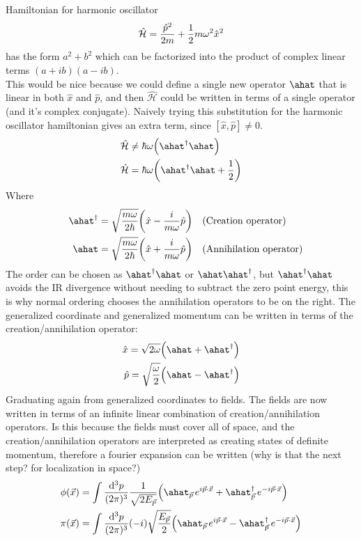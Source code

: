 \newpage Hamiltonian for harmonic oscillator 
\begin{equation}
	\hat{\mathcal{H}}=\frac{\hat{p}^2}{2m}+\oo{2}m\omega^2\hat{x}^2\label{eqn:harmonicHamiltonian}
\end{equation}
has the form \(a^2+b^2\) which can be factorized into the product of complex linear terms \((a+ib)(a-ib)\).\\ This would be nice because we could define a single new operator \(\ahat\) that is linear in both \(\hat{x}\) and \(\hat{p}\), and then \(\hat{\mathcal{H}}\) could be written in terms of a single operator (and it's complex conjugate). 
Naively trying this substitution for the harmonic oscillator hamiltonian gives an extra term, since \([\hat{x},\hat{p}]\neq0\). 
\begin{align*}
	\hat{\mathcal{H}}&\neq\hbar\omega\qty(\ahat^{\dagger}\ahat)
	\\
	\hat{\mathcal{H}}&=\hbar\omega\qty(\ahat^{\dagger}\ahat+\frac{1}{2})
\end{align*}
Where
\begin{align*}
	\quad\ahat^{\dagger}&=\sqrt{\frac{m\omega}{2\hbar}}\qty(\hat{x}-\frac{i}{m\omega}\hat{p})\quad \text{(Creation operator)}
	\\
	\quad\ahat      &=\sqrt{\frac{m\omega}{2\hbar}}\qty(\hat{x}+\frac{i}{m\omega}\hat{p})\quad \text{(Annihilation operator)}
\end{align*}
The order can be chosen as \(\ahat^{\dagger}\ahat\) or \(\ahat\ahat^{\dagger}\), but \(\ahat^{\dagger}\ahat\) avoids the IR divergence without needing to subtract the zero point energy, this is why normal ordering chooses the annihilation operators to be on the right. The generalized coordinate and generalized momentum can be written in terms of the creation/annihilation operator:
\begin{align*}
	\hat{x}=\sqrt{2\omega}\qty(\ahat+\ahat^{\dagger})%
	\\
	\hat{p}=\sqrt{\frac{\omega}{2}}\qty(\ahat-\ahat^{\dagger})
\end{align*}
Graduating again from generalized coordinates to fields. The fields are now written in terms of an infinite linear combination of creation/annihilation operators. Is this because the fields must cover all of space, and the creation/annihilation operators are interpreted as creating states of definite momentum, therefore a fourier expansion can be written (why is that the next step? for localization in space?)
\begin{align}
	\phi(\vec{x})&=\int
	\frac{\d^3p}{(2\pi)^3}
	\oo{\sqrt{2E_{\vec{p}}}}
	\qty(
		\ahat_{\ppp}e^{i\vec{p}\cdot\vec{x}}
		+
		\ahat_{\vec{p}}^{\dagger}\,e^{-i\vec{p}\cdot\vec{x}}
	)
	\\
	\pi(\vec{x})&=\int\frac{\d^3p}{(2\pi)^3}
	(-i)\sqrt{\frac{E_{\vec{p}}}{2}}
	\qty(
		\ahat_{\ppp}e^{i\vec{p}\cdot\vec{x}}
		-
		\ahat_{\vec{p}}^{\dagger}\,e^{-i\vec{p}\cdot\vec{x}}
	)
\end{align}
